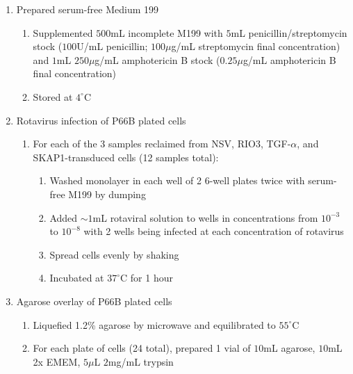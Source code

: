 \begin{enumerate}
	\item Prepared serum-free Medium 199
		\begin{enumerate}
			\item Supplemented $500$mL incomplete M199 with $5$mL penicillin/streptomycin stock ($100$U/mL penicillin; $100\mu$g/mL streptomycin final concentration) and $1$mL $250\mu$g/mL amphotericin B stock ($0.25\mu$g/mL amphotericin B final concentration)
			\item Stored at $4^{\circ}$C
		\end{enumerate}
	\item Rotavirus infection of P66B plated cells
			\begin{enumerate}
				\item For each of the 3 samples reclaimed from NSV, RIO3, TGF-$\alpha$, and SKAP1-transduced cells (12 samples total):
					\begin{enumerate}
						\item Washed monolayer in each well of 2 6-well plates twice with serum-free M199 by dumping
						\item Added $\sim 1$mL rotaviral solution to wells in concentrations from $10^{-3}$ to $10^{-8}$ with 2 wells being infected at each concentration of rotavirus
						\item Spread cells evenly by shaking
						\item Incubated at $37^{\circ}$C for 1 hour
					\end{enumerate}
			\end{enumerate}
		\item Agarose overlay of P66B plated cells
			\begin{enumerate}
				\item Liquefied 1.2\% agarose by microwave and equilibrated to $55^{\circ}$C
				\item For each plate of cells (24 total), prepared 1 vial of $10$mL agarose, $10$mL 2x EMEM, $5\mu$L $2$mg/mL trypsin

\end{enumerate}
\end{enumerate}
